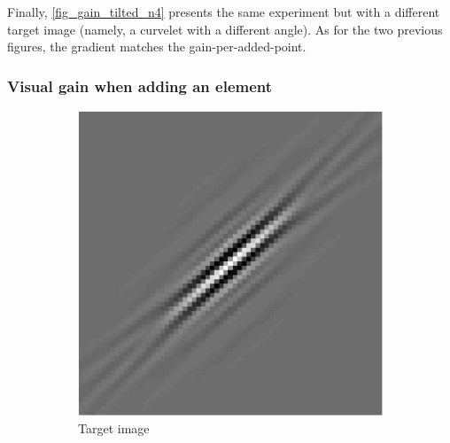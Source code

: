 \noindent
Finally, \cref{fig_gain_tilted_n4} presents the same experiment but with a different target image (namely, a curvelet with a different angle). As for the two previous figures, the gradient matches the gain-per-added-point.

\subsubsection{Visual gain when adding an element}

\begin{figure}[!ht]\centering
\begin{subfigure}[b]{0.32\linewidth}\centering
\includegraphics[width=\linewidth]{figures/before_after/xp_128x128_sc2_angl1_K3_S3_node4before_target.pdf}
	\caption{Target image}\label{fig_beforeafter-target}
\end{subfigure}
\begin{subfigure}[b]{0.32\linewidth}\centering

\end{subfigure}
\end{figure}

